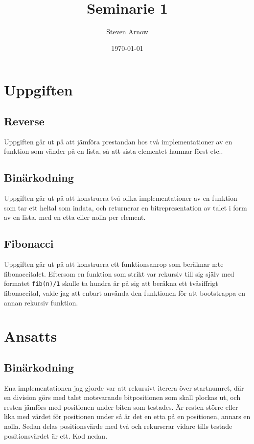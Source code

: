 \documentclass[a4paper, 11pt]{article}
\title{Seminarie 1}
\author{Steven Arnow}
\date{\today}
\begin{document}
\maketitle 

\section{Uppgiften}

\subsection{Reverse}

Uppgiften går ut på att jämföra prestandan hos två implementationer av en funktion som vänder på en lista, så att sista elementet hamnar först etc..


\subsection{Binärkodning}

Uppgiften går ut på att konstruera två olika implementationer av en funktion som tar ett heltal som indata, och returnerar en bitrepresentation av talet i form av en lista, med en etta eller nolla per element.


\subsection{Fibonacci}
Uppgiften går ut på att konstruera ett funktionsanrop som beräknar n:te fibonaccitalet. Eftersom en funktion som strikt var rekursiv till sig själv med formatet \texttt{fib(n)/1} skulle ta hundra år på sig att beräkna ett tvåsiffrigt fibonaccital, valde jag att enbart använda den funktionen för att bootstrappa en annan rekursiv funktion.






\section{Ansatts}

\subsection{Binärkodning}

Ena implementationen jag gjorde var att rekursivt iterera över startnumret, där en division görs med talet motsvarande bitpositionen som skall plockas ut, och resten jämförs med positionen under biten som testades. Är resten större eller lika med värdet för positionen under så är det en etta på en positionen, annars en nolla. Sedan delas positionsvärde med två och rekurserar vidare tills testade positionsvärdet är ett. Kod nedan.
\end{document}
